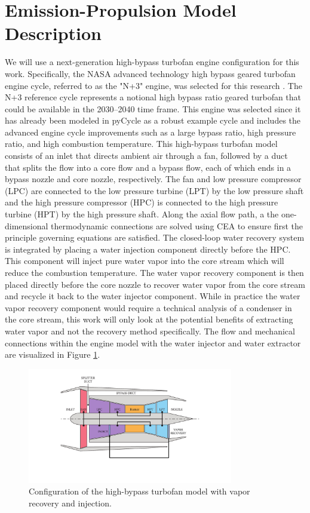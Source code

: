 \documentclass[conf]{new-aiaa}
\begin{document}
\section{Emission-Propulsion Model Description}
\label{sec:epModel}
We will use a next-generation high-bypass turbofan engine configuration for this work.
Specifically, the NASA advanced technology high bypass geared turbofan engine cycle, referred to as the "N+3" engine, was selected for this research \cite[]{Hendricks2019}.
The N+3 reference cycle represents a notional high bypass ratio geared turbofan that could be available in the 2030–2040 time frame.
This engine was selected since it has already been modeled in pyCycle as a robust example cycle and includes the advanced engine cycle improvements such as a large bypass ratio, high pressure ratio, and high combustion temperature.
This high-bypass turbofan model consists of an inlet that directs ambient air through a fan, followed by a duct that splits the flow into a core flow and a bypass flow, each of which ends in a bypass nozzle and core nozzle, respectively.
The fan and low pressure compressor (LPC) are connected to the low pressure turbine (LPT) by the low pressure shaft and the high pressure compressor (HPC) is connected to the high pressure turbine (HPT) by the high pressure shaft.
Along the axial flow path, a the one-dimensional thermodynamic connections are solved using CEA to ensure first the principle governing equations are satisfied.
The closed-loop water recovery system is integrated by placing a water injection component directly before the HPC.
This component will inject pure water vapor into the core stream which will reduce the combustion temperature.
The water vapor recovery component is then placed directly before the core nozzle to recover water vapor from the core stream and recycle it back to the water injector component.
While in practice the water vapor recovery component would require a technical analysis of a condenser in the core stream, this work will only look at the potential benefits of extracting water vapor and not the recovery method specifically.
The flow and mechanical connections within the engine model with the water injector and water extractor are visualized in Figure \ref{fig:hbtf_cycle}.

\begin{figure}[H]
	\centering
	\includegraphics[width=0.8\textwidth]{turbofan_wvr.pdf}
	\caption{Configuration of the high-bypass turbofan model with vapor recovery and injection.}
	\label{fig:hbtf_cycle}
\end{figure}
\end{document}
